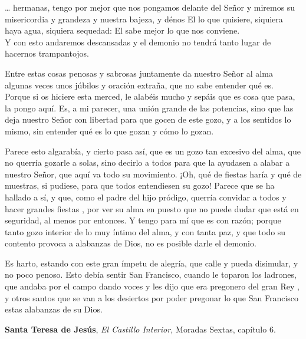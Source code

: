 		\begin{patercite}
			\ldots{} hermanas, tengo por mejor que nos pongamos delante del Señor y miremos su misericordia y grandeza y nuestra bajeza, y dénos El lo que quisiere, siquiera haya agua, siquiera sequedad: El sabe mejor lo que nos conviene.\\ Y con esto andaremos descansadas y el demonio no tendrá tanto lugar de hacernos trampantojos.
			
			Entre estas cosas penosas y sabrosas juntamente da nuestro Señor al alma algunas veces unos júbilos y oración extraña, que no sabe entender qué es.\\ Porque si os hiciere esta merced, le alabéis mucho y sepáis que es cosa que pasa, la pongo aquí. Es, a mi parecer, una unión grande de las potencias, sino que las deja nuestro Señor con libertad para que gocen de este gozo, y a los sentidos lo mismo, sin entender qué es lo que gozan y cómo lo gozan.
			
			Parece esto algarabía, y cierto pasa así, que es un gozo tan excesivo del alma, que no querría gozarle a solas, sino decirlo a todos para que la ayudasen a alabar a nuestro Señor, que aquí va todo su movimiento. ¡Oh, qué de fiestas haría y qué de muestras, si pudiese, para que todos entendiesen su gozo! Parece que se ha hallado a sí, y que, como el padre del hijo pródigo, querría convidar a todos y hacer grandes fiestas , por ver su alma en puesto que no puede dudar que está en seguridad, al menos por entonces. Y tengo para mí que es con razón; porque tanto gozo interior de lo muy íntimo del alma, y con tanta paz, y que todo su contento provoca a alabanzas de Dios, no es posible darle el demonio.
			
			Es harto, estando con este gran ímpetu de alegría, que calle y pueda disimular, y no poco penoso. Esto debía sentir San Francisco, cuando le toparon los ladrones, que andaba por el campo dando voces y les dijo que era pregonero del gran Rey , y otros santos que se van a los desiertos por poder pregonar lo que San Francisco estas alabanzas de su Dios.
			
			\textbf{Santa Teresa de Jesús}, \emph{El Castillo Interior,} Moradas Sextas, capítulo 6.
		\end{patercite}
